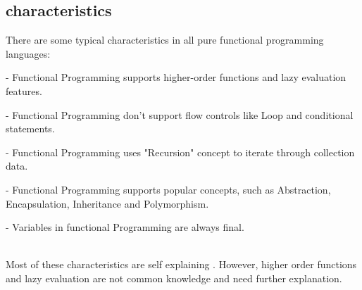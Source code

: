\subsection{characteristics}
There are some typical characteristics in all pure functional programming languages:\\
\begin{MyIndentedList}
    \begin{MyIndentedList}
        \item - Functional Programming supports higher-order functions and lazy evaluation features.
        \item - Functional Programming don't support flow controls like Loop and conditional statements.
        \item - Functional Programming uses "Recursion" concept to iterate through collection data.
        \item - Functional Programming supports popular concepts, such as Abstraction, Encapsulation, Inheritance and Polymorphism.
        \item - Variables in functional Programming are always final.
    \end{MyIndentedList}
\end{MyIndentedList}\\
Most of these characteristics are self explaining . However, higher order functions and lazy evaluation are not common knowledge and need further explanation.
